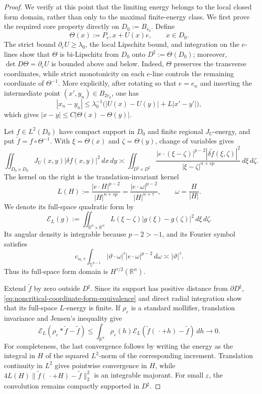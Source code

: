 \documentclass[11pt,reqno]{amsart}
\numberwithin{equation}{section}
\newcommand{\R}{\mathbb R}
\newcommand{\dd}{\,d}
\theoremstyle{remark}
\begin{document}
\begin{proof}
We verify at this point that the limiting energy belongs to the local
closed form domain, rather than only to the maximal finite-energy
class.  We first prove the required core property directly on
\(D_0:=B_{r_0}\).  Define
\[
 \Theta(x):=P_{e^\perp}x+U(x)e,
 \qquad x\in D_0.
\]
The strict bound \(\partial_eU\ge\lambda_0\), the local Lipschitz
bound, and integration on the \(e\)-lines show that \(\Theta\) is
bi-Lipschitz from \(D_0\) onto \(D^\sharp:=\Theta(D_0)\); moreover,
\(\det D\Theta=\partial_eU\) is bounded above and below.  Indeed,
\(\Theta\) preserves the transverse coordinates, while strict
monotonicity on each \(e\)-line controls the remaining coordinate of
\(\Theta^{-1}\).  More explicitly, after rotating so that \(e=e_n\)
and inserting the intermediate point \((x',y_n)\in B_{2r_0}\), one has
\[
 |x_n-y_n|\le\lambda_0^{-1}
 \bigl(|U(x)-U(y)|+L|x'-y'|\bigr),
\]
which gives \(|x-y|\le C|\Theta(x)-\Theta(y)|\).

Let \(f\in L^2(D_0)\) have compact support in \(D_0\) and finite
regional \(J_U\)-energy, and put
\(\widetilde f=f\circ\Theta^{-1}\).  With
\(\xi=\Theta(x)\) and \(\zeta=\Theta(y)\), change of variables gives
\begin{equation}
 \iint_{D_0\times D_0}J_U(x,y)|\delta f(x,y)|^2\dd x\!\dd y
 \asymp
 \iint_{D^\sharp\times D^\sharp}
 \frac{|e\cdot(\xi-\zeta)|^{p-2}
       |\delta\widetilde f(\xi,\zeta)|^2}
 {|\xi-\zeta|^{n+sp}}\dd\xi\!\dd\zeta.
 \label{eq:noncritical-coordinate-form-equivalence}
\end{equation}
The kernel on the right is the translation-invariant kernel
\[
 L(H):=\frac{|e\cdot H|^{p-2}}{|H|^{n+sp}}
 =\frac{|e\cdot\omega|^{p-2}}{|H|^{n+\tau}},
 \qquad \omega=\frac H{|H|}.
\]
We denote its full-space quadratic form by
\[
 \mathcal E_L(g):=\iint_{\R^n\times\R^n}
 L(\xi-\zeta)|g(\xi)-g(\zeta)|^2\dd\xi\!\dd\zeta.
\]
Its angular density is integrable because \(p-2>-1\), and its Fourier
symbol satisfies
\[
 c_{n,\tau}\int_{\mathbb S^{n-1}}
 |\vartheta\cdot\omega|^\tau|e\cdot\omega|^{p-2}\dd\omega
 \asymp |\vartheta|^\tau.
\]
Thus its full-space form domain is \(H^{\tau/2}(\R^n)\).

Extend \(\widetilde f\) by zero outside \(D^\sharp\).  Since its
support has positive distance from \(\partial D^\sharp\),
\eqref{eq:noncritical-coordinate-form-equivalence} and direct radial
integration show that its full-space \(L\)-energy is finite.  If
\(\rho_\varepsilon\) is a standard mollifier, translation invariance
and Jensen's inequality give
\[
 \mathcal E_L(\rho_\varepsilon*\widetilde f-\widetilde f)
 \le\int_{\R^n}\rho_\varepsilon(h)
       \mathcal E_L(\widetilde f(\,\cdot+h)-\widetilde f)\dd h
 \longrightarrow0.
\]
For completeness, the last convergence follows by writing the energy
as the integral in \(H\) of the squared \(L^2\)-norm of the
corresponding increment.  Translation continuity in \(L^2\) gives
pointwise convergence in \(H\), while
\(4L(H)\|\widetilde f(\,\cdot+H)-\widetilde f\|_2^2\) is an integrable
majorant.  For small \(\varepsilon\), the convolution remains compactly
supported in \(D^\sharp\).


\end{proof}
\end{document}
